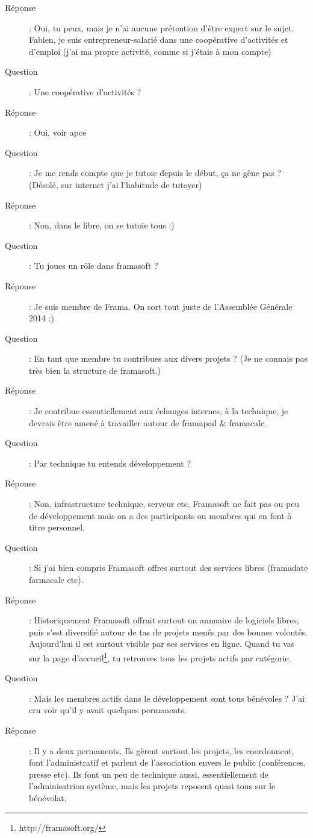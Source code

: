 \documentclass[a4paper,12pt, draft]{report}
\begin{document}
\begin{description}
\item [Réponse]:  Oui, tu peux, mais je n'ai aucune prétention d'être expert sur le sujet.  Fabien, je suis entrepreneur-salarié dans une coopérative d'activités et d'emploi (j'ai ma propre activité, comme si j'étais à mon compte)
\item [Question]:  Une coopérative d'activités ?
\item [Réponse]:  Oui, voir apce\cite{apce}
\item [Question]:  Je me rends compte que je tutoie depuis le début, ça ne gène pas ? (Désolé, sur internet j'ai l'habitude de tutoyer)
\item [Réponse]:  Non, dans le libre, on se tutoie tous ;)
\item [Question]:  Tu joues un rôle dans framasoft ?
\item [Réponse]:  Je suis membre de Frama. On sort tout juste de l'Assemblée Générale 2014 :)
\item [Question]:  En tant que membre tu contribues aux divers projets ? (Je ne connais pas très bien la structure de framasoft.)
\item [Réponse]:  Je contribue essentiellement aux échanges internes, à la technique, je devrais être amené à travailler autour de framapad & framacalc.
\item [Question]:  Par technique tu entends développement ?
\item [Réponse]:  Non, infrastructure technique, serveur etc. Framasoft ne fait pas ou peu de développement mais on a des participants ou membres qui en font à titre personnel.
\item [Question]:  Si j'ai bien compris Framasoft offres surtout des services libres (framadate farmacalc etc).
\item [Réponse]:  Historiquement Framasoft offrait surtout un annuaire de logiciels libres, puis s'est diversifié autour de tas de projets menés par des bonnes volontés. Aujourd'hui il est surtout visible par ses services en ligne. Quand tu vas sur la page d'accueil\footnote{http://framasoft.org/}, tu retrouves tous les projets actifs par catégorie.
\item [Question]:  Mais les membres actifs dans le développement sont tous bénévoles ? J'ai cru voir qu'il y avait quelques permanents.
\item [Réponse]:  Il y a deux permanents. Ils gèrent surtout les projets, les coordonnent, font l'administratif et parlent de l'association envers le public (conférences, presse etc). Ils font un peu de technique aussi, essentiellement de l'adminisatrion système, mais les projets reposent quasi tous sur le bénévolat.

\end{description}
\end{document}
